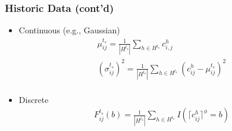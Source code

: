 \documentclass[t]{beamer}
\begin{document}
\begin{frame}\frametitle{Historic Data \small{(cont'd)}}
\begin{itemize}
\item Continuous (e.g., Gaussian)
\begin{gather*}
	\mu_{ij}^{t_s} = \frac{1}{|H^{t_s}|}\sum_{h\in H^{t_s}} c_{i,j}^h\\ 
	(\sigma_{ij}^{t_s})^2 = \frac{1}{|H^{t_s}|}\sum_{h\in H^{t_s}} (c_{ij}^h-\mu_{ij}^{t_s})^2\\
\end{gather*}
\item Discrete
\begin{gather*}
  F_{ij}^{t_s}(b) = \frac{1}{|H^{t_s}|}\sum_{h\in H^{t_s}} I(\lceil c_{ij}^h \rceil^\phi= b)
\end{gather*}
\end{itemize}
\end{frame}
\end{document}
